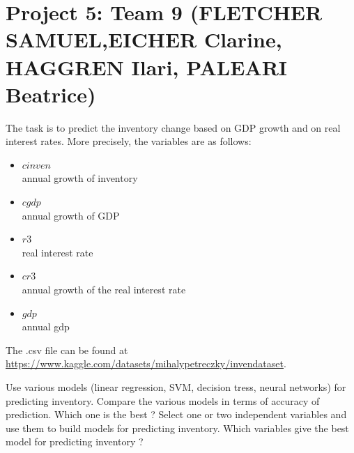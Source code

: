\documentclass{article}
\begin{document}
   

 
 \section*{Project 5: Team 9 (FLETCHER	SAMUEL,EICHER	Clarine, HAGGREN Ilari, PALEARI	Beatrice) }

  The task is to predict the inventory change based on GDP growth and on real interest rates. More precisely, the variables are as follows:
  \begin{itemize}
  \item{$cinven$\\}  annual growth of inventory
  \item{$cgdp$\\}    annual growth of GDP %
  \item{$r3$\\}      real interest rate      
  \item{$cr3$\\}     annual growth of the real interest rate      
  \item{$gdp$\\}     annual gdp      
 \end{itemize}

 The .csv file can be found at \url{https://www.kaggle.com/datasets/mihalypetreczky/invendataset}. 
   
  Use various models (linear regression, SVM, decision tress, neural networks) for predicting inventory. Compare the various models in terms of accuracy of prediction. Which one is the best ? 
   Select one or two independent variables  and use them to build models for predicting inventory.
Which variables give the best model for predicting  inventory  ?  



\end{document}
